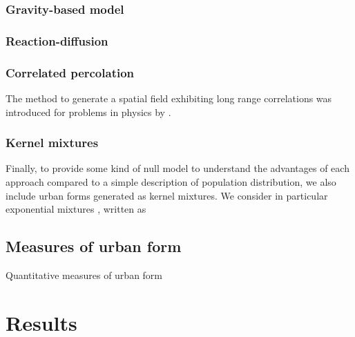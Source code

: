 \documentclass[10pt]{article}
\begin{document}
\subsubsection*{Gravity-based model}

\cite{li2019singularity}


\subsubsection*{Reaction-diffusion}

\cite{10.1371/journal.pone.0203516}


\subsubsection*{Correlated percolation}

\cite{makse1998modeling}

The method to generate a spatial field exhibiting long range correlations was introduced for problems in physics by \cite{makse1996method}.

\subsubsection*{Kernel mixtures}

Finally, to provide some kind of null model to understand the advantages of each approach compared to a simple description of population distribution, we also include urban forms generated as kernel mixtures. We consider in particular exponential mixtures \cite{anas1998urban}, written as






\subsection*{Measures of urban form}


Quantitative measures of urban form






\section*{Results}
\end{document}
